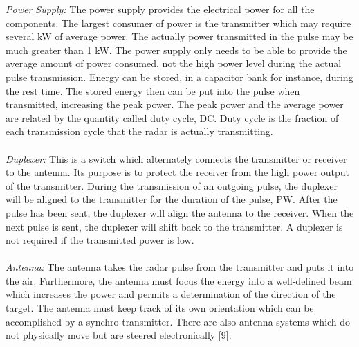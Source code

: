 \documentclass[a4paper,12pt]{report}
\begin{document}
$$\textit{Power Supply:} The power supply provides the electrical power for all the components.  The largest consumer of power is the transmitter which may require several kW of average power.  The actually power transmitted in the pulse may be much greater than 1 kW.  The power supply only needs to be able to provide the average amount of power consumed, not the high power level during the actual 
pulse transmission.  Energy can be stored, in a capacitor bank for instance, during the rest time.  The stored energy then can be put into the pulse when transmitted, increasing the peak power.  The peak power and the average power are related by the quantity called duty cycle, DC.  Duty cycle is the fraction of each transmission cycle that the radar is actually transmitting.\\\\
\textit{Duplexer:} This is a switch which alternately connects the transmitter or receiver to the antenna. Its purpose is to protect the receiver from the high power output of the transmitter. During the transmission of an outgoing pulse, the duplexer will be aligned to the transmitter for the duration of the pulse, PW. After the pulse has been sent, the duplexer will align the antenna to the receiver. When the next pulse is sent, the duplexer will shift back to the transmitter. A duplexer is not required if the transmitted power is low.\\\\
\textit{Antenna:} The antenna takes the radar pulse from the transmitter and puts it into the air. Furthermore, the antenna must focus the energy into a well-defined beam which increases the power and permits a determination of the direction of the target. The antenna must keep track of its own orientation which can be accomplished by a synchro-transmitter. There are also antenna systems which do not physically move but are steered electronically [9]. 
\end{document}
